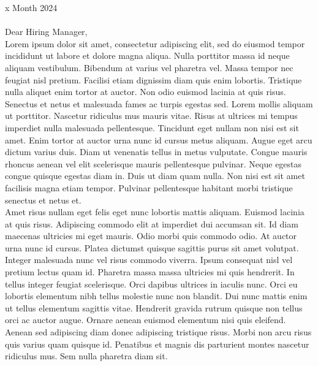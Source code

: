 \vspace{30pt}

x Month 2024 \\ \\

Dear Hiring Manager, \\

Lorem ipsum dolor sit amet, consectetur adipiscing elit, sed do eiusmod tempor incididunt ut labore et dolore magna aliqua. Nulla porttitor massa id neque aliquam vestibulum. Bibendum at varius vel pharetra vel. Massa tempor nec feugiat nisl pretium. Facilisi etiam dignissim diam quis enim lobortis. Tristique nulla aliquet enim tortor at auctor. Non odio euismod lacinia at quis risus. Senectus et netus et malesuada fames ac turpis egestas sed. Lorem mollis aliquam ut porttitor. Nascetur ridiculus mus mauris vitae. Risus at ultrices mi tempus imperdiet nulla malesuada pellentesque. Tincidunt eget nullam non nisi est sit amet. Enim tortor at auctor urna nunc id cursus metus aliquam. Augue eget arcu dictum varius duis. Diam ut venenatis tellus in metus vulputate. Congue mauris rhoncus aenean vel elit scelerisque mauris pellentesque pulvinar. Neque egestas congue quisque egestas diam in. Duis ut diam quam nulla. Non nisi est sit amet facilisis magna etiam tempor. Pulvinar pellentesque habitant morbi tristique senectus et netus et. \\

Amet risus nullam eget felis eget nunc lobortis mattis aliquam. Euismod lacinia at quis risus. Adipiscing commodo elit at imperdiet dui accumsan sit. Id diam maecenas ultricies mi eget mauris. Odio morbi quis commodo odio. At auctor urna nunc id cursus. Platea dictumst quisque sagittis purus sit amet volutpat. Integer malesuada nunc vel risus commodo viverra. Ipsum consequat nisl vel pretium lectus quam id. Pharetra massa massa ultricies mi quis hendrerit. In tellus integer feugiat scelerisque. Orci dapibus ultrices in iaculis nunc. Orci eu lobortis elementum nibh tellus molestie nunc non blandit. Dui nunc mattis enim ut tellus elementum sagittis vitae. Hendrerit gravida rutrum quisque non tellus orci ac auctor augue. Ornare aenean euismod elementum nisi quis eleifend. Aenean sed adipiscing diam donec adipiscing tristique risus. Morbi non arcu risus quis varius quam quisque id. Penatibus et magnis dis parturient montes nascetur ridiculus mus. Sem nulla pharetra diam sit. \\

